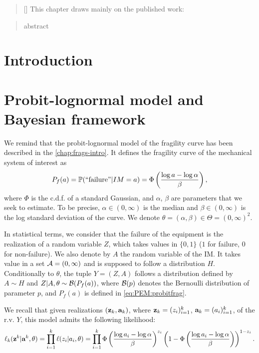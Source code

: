 


\begin{abstract}[\hspace*{-10pt}]
    This chapter draws mainly on the published work:   %
\end{abstract}

\begin{abstract}
    abstract
\end{abstract}


\minitoc

\section{Introduction}


\section{Probit-lognormal model and Bayesian framework}

We remind that the probit-lognormal model of the fragility curve has been described in the \cref{chap:frags-intro}.
It defines the fragility curve of the mechanical system of interest as 
\begin{equation}\label{eq:PEM:probitfrag}
    P_f(a)=\mathbb{P}(\text{``failure''}|IM=a) = \Phi\left(\frac{\log a-\log\alpha}{\beta}\right),
\end{equation}
where $\Phi$ is the c.d.f. of a standard Gaussian, and $\alpha$, $\beta$ are parameters that we seek to estimate. To be precise, $\alpha\in(0,\infty)$ is the median and $\beta\in(0,\infty)$ is the log standard deviation of the curve. We denote $\theta=(\alpha,\beta)\in\Theta=(0,\infty)^2$.

In statistical terms, we consider that the failure of the equipment is the realization of a random variable $Z$, which takes values in $\{0,1\}$ ($1$ for failure, $0$ for non-failure). We also denote by $A$ the random variable of the IM. It takes value in a set $\mathcal{A}=(0,\infty)$ and is supposed to follow a distribution $H$. Conditionally to $\theta$, the tuple $Y=(Z,A)$ follows a distribution defined by $A\sim H$ and $Z|A,\theta\sim\mathcal{B}(P_f(a))$, where $\mathcal{B}(p)$ denotes the Bernoulli distribution of parameter $p$, and $P_f(a)$ is defined in \cref{eq:PEM:probitfrag}.

We recall that given realizations $(\mathbf{z}_k,\mathbf{a}_k)$, where $\mathbf{z}_k=(z_i)_{i=1}^k$, $\mathbf{a}_k=(a_i)_{i=1}^k$, of the r.v. $Y$, this model admits the following likelihood:
\begin{equation}
    \ell_k(\mathbf{z}^k|\mathbf{a}^k,\theta) = \prod_{i=1}^k\ell(z_i|a_i,\theta) = \prod_{i=1}^k\Phi\left(\frac{\log a_i-\log\alpha}{\beta}\right)^{z_i}\left(1-\Phi\left(\frac{\log a_i-\log\alpha}{\beta}\right)\right)^{1-z_i}.
\end{equation}




